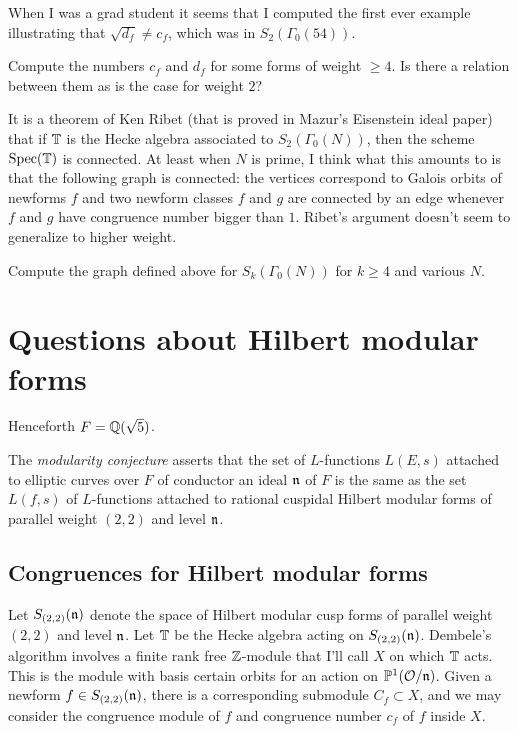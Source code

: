 \documentclass{article}
\begin{document}
When I was a grad student it seems that I computed the first ever
example illustrating that $\sqrt{d_f} \neq c_f$, which was in
$S_2(\Gamma_0(54))$. 


\vspace{1em}
 Compute the numbers $c_f$ and $d_f$ for
some forms of weight $\geq 4$.  Is there a relation between
them as is the case for weight $2$?  


It is a theorem of Ken Ribet (that is proved in Mazur's Eisenstein
ideal paper) that if $\mathbb{T}$ is the Hecke algebra associated to
$S_2(\Gamma_0(N))$, then the scheme $\operatorname{Spec}(\mathbb{T})$ is connected.  At
least when $N$ is prime, I think what this amounts to is that the
following graph is connected: the vertices correspond to Galois orbits
of newforms $f$ and two newform classes $f$ and $g$ are connected by
an edge whenever $f$ and $g$ have congruence number bigger than $1$.
Ribet's argument doesn't seem to generalize to higher weight. 

\vspace{1em}
 Compute the graph defined above for
$S_k(\Gamma_0(N))$ for $k\geq 4$ and various $N$.


\section{Questions about Hilbert modular forms}

Henceforth $F=\mathbb{Q}(\sqrt{5})$.

The {\em modularity conjecture} asserts that the set of $L$-functions
$L(E,s)$ attached to elliptic curves over $F$ of conductor an ideal
$\mathfrak{n}$ of $F$ is the same as the set $L(f,s)$ of $L$-functions attached
to rational cuspidal Hilbert modular forms of parallel weight $(2,2)$
and level $\mathfrak{n}$.



\subsection{Congruences for Hilbert modular forms}

Let $S_{(2,2)}(\mathfrak{n})$ denote the space of Hilbert modular cusp forms of
parallel weight $(2,2)$ and level $\mathfrak{n}$.  Let $\mathbb{T}$ be the Hecke algebra
acting on $S_{(2,2)}(\mathfrak{n})$.   Dembele's algorithm involves a finite
rank free $\mathbb{Z}$-module that I'll call $X$ on which $\mathbb{T}$ acts. 
This is the module with basis certain orbits for an action on $\mathbb{P}^1(\mathcal{O}/\mathfrak{n})$.
Given a newform $f\in S_{(2,2)}(\mathfrak{n})$, there is a corresponding
submodule $C_f \subset X$, and we may consider the congruence module
of $f$ 
and congruence number $c_f$ of $f$ inside $X$.
\end{document}
